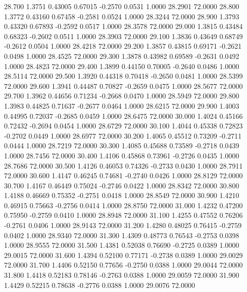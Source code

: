   28.700   1.3751   0.43005   0.67015  -0.2570   0.0531   1.0000  28.2901  72.0000
  28.800   1.3772   0.43160   0.67458  -0.2581   0.0524   1.0000  28.3244  72.0000
  28.900   1.3793   0.43320   0.67893  -0.2592   0.0517   1.0000  28.3578  72.0000
  29.000   1.3815   0.43484   0.68323  -0.2602   0.0511   1.0000  28.3903  72.0000
  29.100   1.3836   0.43649   0.68749  -0.2612   0.0504   1.0000  28.4218  72.0000
  29.200   1.3857   0.43815   0.69171  -0.2621   0.0498   1.0000  28.4525  72.0000
  29.300   1.3878   0.43982   0.69589  -0.2631   0.0492   1.0000  28.4823  72.0000
  29.400   1.3899   0.44150   0.70005  -0.2640   0.0486   1.0000  28.5114  72.0000
  29.500   1.3920   0.44318   0.70418  -0.2650   0.0481   1.0000  28.5399  72.0000
  29.600   1.3941   0.44487   0.70827  -0.2659   0.0475   1.0000  28.5677  72.0000
  29.700   1.3962   0.44656   0.71234  -0.2668   0.0470   1.0000  28.5949  72.0000
  29.800   1.3983   0.44825   0.71637  -0.2677   0.0464   1.0000  28.6215  72.0000
  29.900   1.4003   0.44995   0.72037  -0.2685   0.0459   1.0000  28.6475  72.0000
  30.000   1.4024   0.45166   0.72432  -0.2694   0.0454   1.0000  28.6729  72.0000
  30.100   1.4044   0.45338   0.72823  -0.2702   0.0449   1.0000  28.6977  72.0000
  30.200   1.4065   0.45512   0.73209  -0.2711   0.0444   1.0000  28.7219  72.0000
  30.300   1.4085   0.45688   0.73589  -0.2718   0.0439   1.0000  28.7456  72.0000
  30.400   1.4106   0.45868   0.73961  -0.2726   0.0435   1.0000  28.7686  72.0000
  30.500   1.4126   0.46053   0.74326  -0.2733   0.0430   1.0000  28.7911  72.0000
  30.600   1.4147   0.46245   0.74681  -0.2740   0.0426   1.0000  28.8129  72.0000
  30.700   1.4167   0.46449   0.75024  -0.2746   0.0422   1.0000  28.8342  72.0000
  30.800   1.4188   0.46669   0.75352  -0.2751   0.0418   1.0000  28.8549  72.0000
  30.900   1.4210   0.46915   0.75663  -0.2756   0.0414   1.0000  28.8750  72.0000
  31.000   1.4232   0.47200   0.75950  -0.2759   0.0410   1.0000  28.8948  72.0000
  31.100   1.4255   0.47552   0.76206  -0.2761   0.0406   1.0000  28.9143  72.0000
  31.200   1.4280   0.48025   0.76415  -0.2759   0.0402   1.0000  28.9340  72.0000
  31.300   1.4309   0.48773   0.76543  -0.2753   0.0398   1.0000  28.9555  72.0000
  31.500   1.4381   0.52038   0.76690  -0.2725   0.0389   1.0000  29.0015  72.0000
  31.600   1.4394   0.52100   0.77171  -0.2738   0.0389   1.0000  29.0029  72.0000
  31.700   1.4406   0.52150   0.77656  -0.2750   0.0388   1.0000  29.0044  72.0000
  31.800   1.4418   0.52183   0.78146  -0.2763   0.0388   1.0000  29.0059  72.0000
  31.900   1.4429   0.52215   0.78638  -0.2776   0.0388   1.0000  29.0076  72.0000
